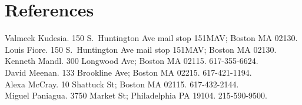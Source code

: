 \documentclass[10pt]{article}
\begin{document}
\section*{References}
Valmeek Kudesia. 150 S.\ Huntington Ave mail stop 151MAV; Boston MA
02130.\\
Louis Fiore. 150 S.\ Huntington Ave mail stop 151MAV; Boston MA
02130.\\
Kenneth Mandl. 300 Longwood Ave; Boston MA 02115. 617-355-6624.\\
David Meenan. 133 Brookline Ave; Boston MA 02215. 617-421-1194.\\
Alexa McCray. 10 Shattuck St; Boston MA 02115. 617-432-2144.\\
Miguel Paniagua. 3750 Market St; Philadelphia PA 19104. 215-590-9500.
\end{document}
